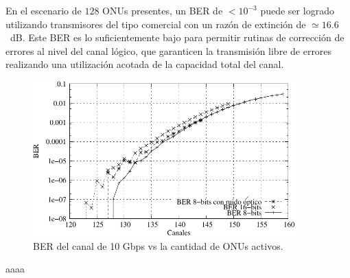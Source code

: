 En el escenario de $128$ ONUs presentes, un BER de $<10^{-3}$ puede ser logrado utilizando transmisores del tipo comercial con un razón de extinción de $\simeq16.6$~dB.
Este BER es lo suficientemente bajo para permitir rutinas de corrección de errores al nivel del canal lógico, que garanticen la transmisión libre de errores realizando una utilización acotada de la capacidad total del canal.

\begin{figure}[t]
  \centering
  \includegraphics[width=4in]{graphs/BER-tesis.pdf} 
  \caption{BER del canal de 10 Gbps vs la cantidad de ONUs activos.}
  \label{sim:access}
\end{figure}
aaaa

